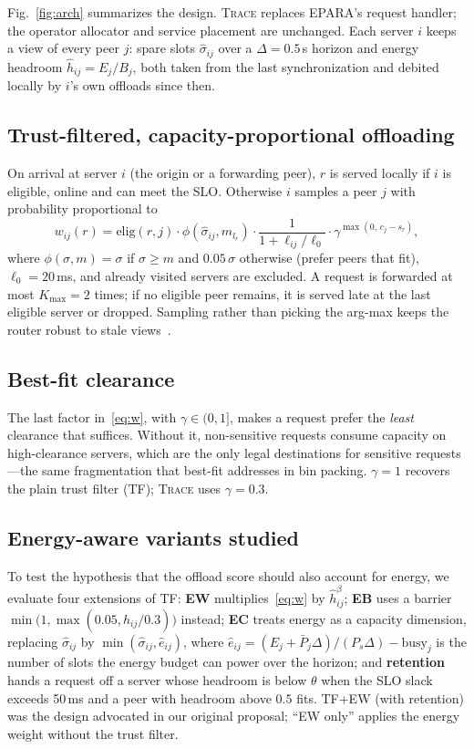 \documentclass[journal]{IEEEtran}
\newcommand{\sys}{\textsc{Trace}}
\begin{document}
Fig.~\ref{fig:arch} summarizes the design. \sys{} replaces EPARA's request handler; the operator allocator and service placement are unchanged. Each server $i$ keeps a view of every peer $j$: spare slots $\hat\sigma_{ij}$ over a $\Delta=0.5$\,s horizon and energy headroom $\hat h_{ij}=E_j/B_j$, both taken from the last synchronization and debited locally by $i$'s own offloads since then.

\subsection{Trust-filtered, capacity-proportional offloading}
On arrival at server $i$ (the origin or a forwarding peer), $r$ is served locally if $i$ is eligible, online and can meet the SLO. Otherwise $i$ samples a peer $j$ with probability proportional to
\begin{equation}
w_{ij}(r)=\mathrm{elig}(r,j)\cdot\phi(\hat\sigma_{ij},m_{l_r})\cdot\frac{1}{1+\ell_{ij}/\ell_0}\cdot\gamma^{\max(0,\,c_j-s_r)},\label{eq:w}
\end{equation}
where $\phi(\sigma,m)=\sigma$ if $\sigma\ge m$ and $0.05\,\sigma$ otherwise (prefer peers that fit), $\ell_0=20$\,ms, and already visited servers are excluded. A request is forwarded at most $K_{\max}=2$ times; if no eligible peer remains, it is served late at the last eligible server or dropped. Sampling rather than picking the arg-max keeps the router robust to stale views~\cite{mitzenmacher2000old}.

\subsection{Best-fit clearance}
The last factor in~\eqref{eq:w}, with $\gamma\in(0,1]$, makes a request prefer the \emph{least} clearance that suffices. Without it, non-sensitive requests consume capacity on high-clearance servers, which are the only legal destinations for sensitive requests---the same fragmentation that best-fit addresses in bin packing. $\gamma=1$ recovers the plain trust filter (TF); \sys{} uses $\gamma=0.3$.

\subsection{Energy-aware variants studied}
To test the hypothesis that the offload score should also account for energy, we evaluate four extensions of TF:
\textbf{EW} multiplies~\eqref{eq:w} by $\hat h_{ij}^{\beta}$;
\textbf{EB} uses a barrier $\min\!\big(1,\max(0.05,\hat h_{ij}/0.3)\big)$ instead;
\textbf{EC} treats energy as a capacity dimension, replacing $\hat\sigma_{ij}$ by $\min(\hat\sigma_{ij},\hat e_{ij})$, where $\hat e_{ij}=(E_j+\bar P_j\Delta)/(P_s\Delta)-\text{busy}_j$ is the number of slots the energy budget can power over the horizon; and
\textbf{retention} hands a request off a server whose headroom is below $\theta$ when the SLO slack exceeds 50\,ms and a peer with headroom above $0.5$ fits.
TF+EW (with retention) was the design advocated in our original proposal; ``EW only'' applies the energy weight without the trust filter.
\end{document}
